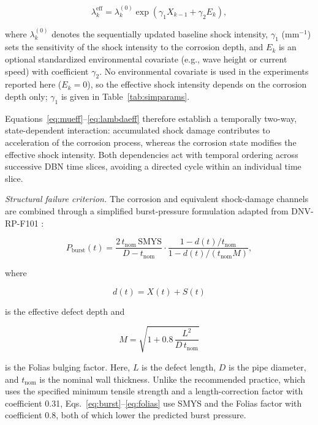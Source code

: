 \documentclass[journal]{IEEEtran}
\begin{document}
\begin{equation}
\lambda^{\mathrm{eff}}_k =
\lambda^{(0)}_k
\exp\!\left(
\gamma_1 X_{k-1}+\gamma_2 E_k
\right),
\label{eq:lambdaeff}
\end{equation}

where $\lambda_k^{(0)}$ denotes the sequentially updated baseline
shock intensity, $\gamma_1$ (mm$^{-1}$) sets the sensitivity of the
shock intensity to the corrosion depth, and $E_k$ is an optional
standardized environmental covariate (e.g., wave height or current
speed) with coefficient $\gamma_2$. No environmental covariate is used
in the experiments reported here ($E_k=0$), so the effective shock
intensity depends on the corrosion depth only; $\gamma_1$ is given in
Table~\ref{tab:simparams}.

Equations~\eqref{eq:mueff}--\eqref{eq:lambdaeff} therefore establish
a temporally two-way, state-dependent interaction: accumulated shock
damage contributes to acceleration of the corrosion process, whereas
the corrosion state modifies the effective shock intensity. Both
dependencies act with temporal ordering across successive DBN time
slices, avoiding a directed cycle within an individual time slice.



\textit{Structural failure criterion.}
The corrosion and equivalent shock-damage channels are combined
through a simplified burst-pressure formulation adapted from
DNV-RP-F101 \cite{dnv2017}:

\begin{equation}
P_{\mathrm{burst}}(t) =
\frac{2\,t_{\mathrm{nom}}\,\mathrm{SMYS}}
     {D-t_{\mathrm{nom}}}
\cdot
\frac{
1-d(t)/t_{\mathrm{nom}}
}{
1-d(t)/(t_{\mathrm{nom}}M)
},
\label{eq:burst}
\end{equation}

where

\[
d(t)=X(t)+S(t)
\]

is the effective defect depth and

\begin{equation}
M =
\sqrt{
1+0.8\,\frac{L^2}{D\,t_{\mathrm{nom}}}
}
\label{eq:folias}
\end{equation}

is the Folias bulging factor. Here, $L$ is the defect length, $D$ is
the pipe diameter, and $t_{\mathrm{nom}}$ is the nominal wall
thickness. Unlike the recommended practice, which uses the specified
minimum tensile strength and a length-correction factor with
coefficient 0.31, Eqs.~\eqref{eq:burst}--\eqref{eq:folias} use SMYS and
the Folias factor with coefficient 0.8, both of which lower the
predicted burst pressure.
\end{document}
